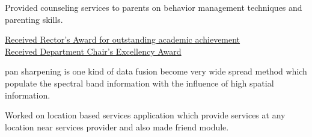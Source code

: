 \documentclass[]{rahulworld-resume}
\begin{document}
\begin{minipage}[t]{0.66\textwidth}
\begin{minipage}{0.90\textwidth\vspace{2pt}}
Provided counseling services to parents on behavior management techniques and parenting skills.
\end{minipage}
\sectionsep

 
\noindent
\hspace{5em}%
\begin{minipage}{0.85\textwidth\vspace{2pt}}
	\href{https://loona-il.000webhostapp.com/resume-references/BA-and-honorary.pdf}{Received Rector's Award for outstanding academic achievement} \\
	\href{https://loona-il.000webhostapp.com/resume-references/BA-and-honorary.pdf}{Received Department Chair’s Excellency Award}
\end{minipage}
\sectionsep

 
\noindent
\hspace{5em}%
\begin{minipage}{0.85\textwidth\vspace{2pt}}
pan sharpening is one kind of data fusion become very wide spread method which populate the spectral band information with the influence of high spatial information.
\end{minipage}
\sectionsep

 
\noindent
\hspace{5em}%
\begin{minipage}{0.85\textwidth\vspace{2pt}}
Worked on location based services application which provide services at any location near
services provider and also made friend module.
\end{minipage}

\end{minipage}
\end{document}
